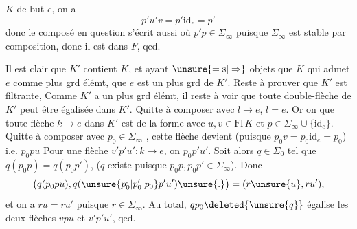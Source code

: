 $K$ de but $e$, on a
\[
p'u'v=p'\mathrm{id}_e=p'
\]
donc le composé en question s'écrit aussi
où $p'p\in\Sigma_\infty$ puisque $\Sigma_\infty$ est stable par composition, donc il est dans  $F$, qed.

Il est clair que $K'$ contient $K$, et ayant $\unsure{=\mathrm{s}|\Rightarrow}$ objets que $K$ qui admet $e$ comme plus grd élémt, que $e$ est un plus grd  de $K'$. Reste à prouver que $K'$ est filtrante, Comme $K'$ a un plus grd élémt, il reste à voir  que toute double-flèche  de $K'$ peut être égalisée dans $K'$. Quitte à composer avec $l\longrightarrow e$,  $l=e$. Or on  que toute flèche $k\longrightarrow e$ dans $K'$ est de la forme
 avec $u,v\in\mathrm{Fl}\,K$ et $p\in\Sigma_\infty\cup\{\mathrm{id}_e\}$. Quitte à composer avec $p_0\in\Sigma_\infty$ , cette  flèche devient (puisque $p_0v=p_0\mathrm{id}_e=p_0$)
 i.e. $p_0pu$  Pour une flèche $v'p'u':k\longrightarrow e$, on  $p_0p'u'$. Soit alors $q\in\Sigma_0$ tel que $q(p_0p)=q(p_0p')$,  ($q$ existe puisque $p_0p,p_0p'\in\Sigma_\infty$). Donc
\[
\big(q(p_0pu),q(\unsure{p_0^{.}|p_0'|p_0}p'u')\unsure{.}\big)=(r\unsure{u},ru'),
\]
et on a $ru=ru'$ puisque $r\in\Sigma_\infty$. Au total, $qp_0\deleted{\unsure{q}}$ égalise les deux flèches $vpu$ et $v'p'u'$, qed.
